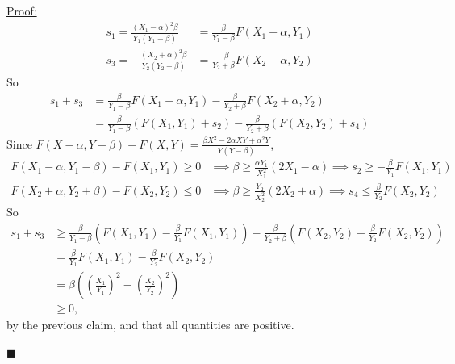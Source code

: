 \documentclass{article}
\theoremstyle{case}
\newenvironment{claim}[1]{\par\noindent\underline{Claim:}\space#1}{}
\newenvironment{claimproof}[1]{\par\noindent\underline{Proof:}\space#1}{\hfill $\blacksquare$}
\begin{document}
\begin{claimproof}
\begin{align*}
s_1 = \frac{\left( X_1 - \alpha \right)^2\beta }{Y_1\left( Y_1 - \beta\right)} & = \frac{\beta}{Y_1-\beta}F(X_1+\alpha, Y_1) \\
s_3 = -\frac{\left( X_2 + \alpha \right)^2 \beta }{Y_2\left( Y_2+\beta\right) } & = \frac{-\beta}{Y_2 + \beta}F(X_2+\alpha, Y_2)
\end{align*}
So
\begin{align*}
s_1 + s_3 & = \frac{\beta}{Y_1-\beta}F(X_1+\alpha, Y_1) - \frac{\beta}{Y_2 + \beta}F(X_2+\alpha, Y_2) \\
& = \frac{\beta}{Y_1 - \beta}\left( F(X_1, Y_1) + s_2\right) - \frac{\beta}{Y_2 + \beta}\left( F(X_2,Y_2) + s_4\right)
\end{align*}
Since $F(X - \alpha, Y - \beta) - F(X, Y) = \frac{\beta X^2 - 2\alpha XY + \alpha^2 Y}{Y\left( Y-\beta\right)}$, 
\begin{align*}
F(X_1 - \alpha, Y_1 - \beta) - F(X_1, Y_1) \geq 0 & \implies \beta \geq \frac{\alpha Y_1}{X_1^2}\left( 2X_1 - \alpha \right) \implies s_2 \geq -\frac{\beta}{Y_1}F(X_1, Y_1) \\
F(X_2+\alpha, Y_2+\beta) - F(X_2, Y_2) \leq 0 & \implies \beta \geq \frac{Y_2}{X_2^2}\left( 2X_2 + \alpha \right) \implies s_4 \leq \frac{\beta}{Y_2}F(X_2, Y_2)
\end{align*}
So 
\begin{align*}
s_1 + s_3 & \geq \frac{\beta}{Y_1 - \beta}\left( F(X_1, Y_1) - \frac{\beta}{Y_1}F(X_1, Y_1)\right) - \frac{\beta}{Y_2+\beta}\left( F(X_2, Y_2) + \frac{\beta}{Y_2}F(X_2, Y_2)\right) \\
& = \frac{\beta}{Y_1}F(X_1, Y_1) - \frac{\beta}{Y_2}F(X_2, Y_2) \\
& = \beta \left( \left( \frac{X_1}{Y_1}\right)^2 - \left( \frac{X_2}{Y_2}\right)^2 \right) \\
& \geq 0,
\end{align*}
by the previous claim, and that all quantities are positive.

\end{claimproof}
\end{document}
